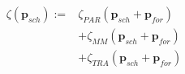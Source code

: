 \begin{equation}
\begin{split}
	\zeta(\textbf{p}_{sch}) := &\zeta_{PAR}(\textbf{p}_{sch}+	\textbf{p}_{for})\\
	&+ \zeta_{MM}(\textbf{p}_{sch}+\textbf{p}_{for})\\
	&+ \zeta_{TRA}(\textbf{p}_{sch}+\textbf{p}_{for})
\end{split}
\label{ch2:equ:cost-global}
\end{equation}